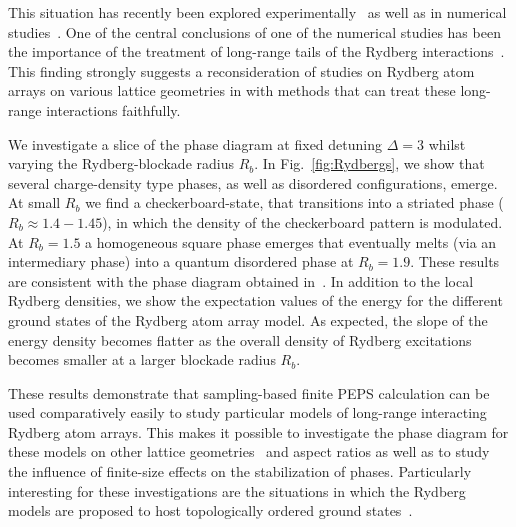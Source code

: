 \documentclass[aps,notitlepage,twocolumn,nofootinbib,superscriptaddress,pra,10pt]{revtex4-2}
\begin{document}
This situation has recently been explored experimentally~\cite{ebadi2021_rydbergExperiment} as well as in numerical studies~\cite{Samajdar2020_Rydberg,ORourke2023_Rydberg_entanglement}. 
One of the central conclusions of one of the numerical studies has been the importance of the treatment of long-range tails of the Rydberg interactions~\cite{ORourke2023_Rydberg_entanglement}. This finding strongly suggests a reconsideration of studies on Rydberg atom arrays on various lattice geometries in with methods that can treat these long-range interactions faithfully. 

We investigate a slice of the phase diagram at fixed detuning $\Delta = 3$ whilst varying the Rydberg-blockade radius $R_b$.
In Fig.~\ref{fig:Rydbergs}, we show that several charge-density type phases, as well as disordered configurations, emerge. 
At small $R_b$ we find a checkerboard-state, that transitions into a striated phase ($R_b \approx 1.4-1.45$), in which the density of the checkerboard pattern is modulated. 
At $R_b = 1.5$ a homogeneous square phase emerges that eventually melts (via an intermediary phase) into a quantum disordered phase at $R_b = 1.9$. 
These results are consistent with the phase diagram obtained in~\cite{ORourke2023_Rydberg_entanglement}. 
In addition to the local Rydberg densities, we show the expectation values of the energy for the different ground states of the Rydberg atom array model. 
As expected, the slope of the energy density becomes flatter as the overall density of Rydberg excitations becomes smaller at a larger blockade radius $R_b$.

These results demonstrate that sampling-based finite PEPS calculation can be used comparatively easily to study particular models of long-range interacting Rydberg atom arrays.
This makes it possible to investigate the phase diagram for these models on other lattice geometries~\cite{samajdar2021_ryd_kagome} and aspect ratios as well as to study the influence of finite-size effects on the stabilization of phases. Particularly interesting for these investigations are the situations in which the Rydberg models are proposed to host topologically ordered ground states~\cite{Verresen21_topoRyd, Semenghini21_topoRyd_Exp}.
\end{document}

